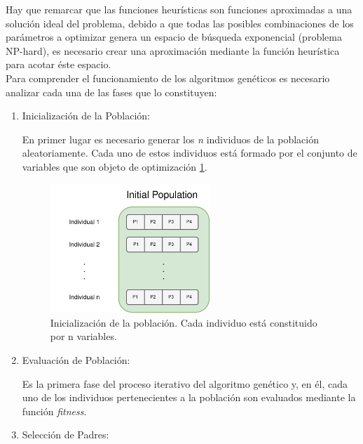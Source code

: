             Hay que remarcar que las funciones heurísticas son funciones aproximadas a una solución ideal del problema, debido a que todas las posibles combinaciones de los parámetros a optimizar genera un espacio de búsqueda exponencial (problema NP-hard), es necesario crear una aproximación mediante la función heurística para acotar éste espacio.\\

            Para comprender el funcionamiento de los algoritmos genéticos es necesario analizar cada una de las fases que lo constituyen:
            
            \begin{enumerate}
                \item Inicialización de la Población:

                        En primer lugar es necesario generar los \textit{n} individuos de la población aleatoriamente. Cada uno de estos individuos está formado por el conjunto de variables que son objeto de optimización \ref{InitialPopulation}.

                        \begin{figure}[h]
                            \centering
                            \includegraphics[width=6cm]{archivos/3.Tecnologias/GA/InitialPopulation}
                            \caption{Inicialización de la población. Cada individuo está constituido por n variables.}
                            \label{InitialPopulation}
                        \end{figure}

                \item Evaluación de Población:

                        Es la primera fase del proceso iterativo del algoritmo genético y, en él, cada uno de los individuos pertenecientes a la población son evaluados mediante la función \textit{fitness}.

                \item Selección de Padres:


\end{enumerate}
